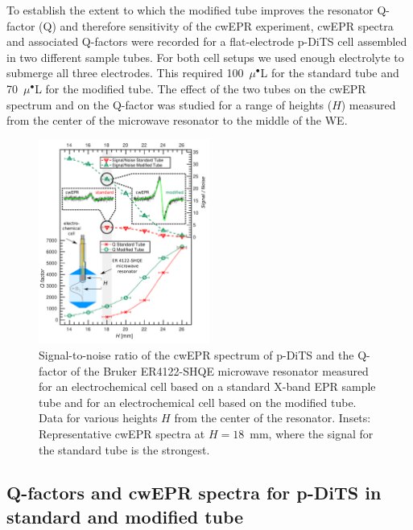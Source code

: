 To establish the extent to which the modified tube improves the resonator Q-factor (Q) and therefore sensitivity of the cwEPR experiment, cwEPR spectra and associated Q-factors were recorded for a flat-electrode p-DiTS cell assembled in two different sample tubes. For both cell setups we used enough electrolyte to submerge all three electrodes. This required 100~$\mu^{\bullet}$L for the standard tube and 70~$\mu^{\bullet}$L for the modified tube. The effect of the two tubes on the cwEPR spectrum and on the Q-factor was studied for a range of heights ($H$) measured from the center of the microwave resonator to the middle of the WE.

\begin{figure}[h]

	\includegraphics[width=0.5\textwidth]{./operando_epr/figures/Q_factors_mod_tube.pdf}
	\caption
	{Signal-to-noise ratio of the cwEPR spectrum of p-DiTS and the Q-factor of the Bruker ER4122-SHQE microwave resonator measured for an electrochemical cell based on a standard X-band EPR sample tube and for an electrochemical cell based on the modified tube. Data for various heights $H$ from the center of the resonator. Insets: Representative cwEPR spectra at $H=18$~mm, where the signal for the standard tube is the strongest.}
	\label{fig:Q_factors_mod_tube}
\end{figure}


\subsection{Q-factors and cwEPR spectra for p-DiTS in standard and modified tube}\label{Q-factor_SNR}

